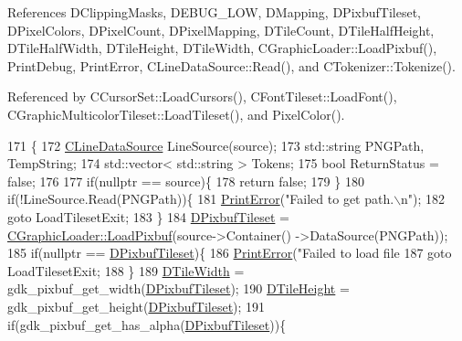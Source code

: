 References D\+Clipping\+Masks, D\+E\+B\+U\+G\+\_\+\+L\+OW, D\+Mapping, D\+Pixbuf\+Tileset, D\+Pixel\+Colors, D\+Pixel\+Count, D\+Pixel\+Mapping, D\+Tile\+Count, D\+Tile\+Half\+Height, D\+Tile\+Half\+Width, D\+Tile\+Height, D\+Tile\+Width, C\+Graphic\+Loader\+::\+Load\+Pixbuf(), Print\+Debug, Print\+Error, C\+Line\+Data\+Source\+::\+Read(), and C\+Tokenizer\+::\+Tokenize().



Referenced by C\+Cursor\+Set\+::\+Load\+Cursors(), C\+Font\+Tileset\+::\+Load\+Font(), C\+Graphic\+Multicolor\+Tileset\+::\+Load\+Tileset(), and Pixel\+Color().


\begin{DoxyCode}
171                                                                     \{
172     \hyperlink{classCLineDataSource}{CLineDataSource} LineSource(source);
173     std::string PNGPath, TempString;
174     std::vector< std::string > Tokens;
175     \textcolor{keywordtype}{bool} ReturnStatus = \textcolor{keyword}{false};
176     
177     \textcolor{keywordflow}{if}(\textcolor{keyword}{nullptr} == source)\{
178         \textcolor{keywordflow}{return} \textcolor{keyword}{false};   
179     \}
180     \textcolor{keywordflow}{if}(!LineSource.Read(PNGPath))\{
181         \hyperlink{Debug_8h_a2ed825eefefe35baf59a93a8c641323d}{PrintError}(\textcolor{stringliteral}{"Failed to get path.\(\backslash\)n"});
182         \textcolor{keywordflow}{goto} LoadTilesetExit;
183     \}
184     \hyperlink{classCGraphicTileset_a5d5adfcdbb347a6df3f57535ca08e3ef}{DPixbufTileset} = \hyperlink{classCGraphicLoader_ac7778dec4fd0ea51674f0b23f3029edf}{CGraphicLoader::LoadPixbuf}(source->Container()
      ->DataSource(PNGPath));
185     \textcolor{keywordflow}{if}(\textcolor{keyword}{nullptr} == \hyperlink{classCGraphicTileset_a5d5adfcdbb347a6df3f57535ca08e3ef}{DPixbufTileset})\{
186         \hyperlink{Debug_8h_a2ed825eefefe35baf59a93a8c641323d}{PrintError}(\textcolor{stringliteral}{"Failed to load file %
187         \textcolor{keywordflow}{goto} LoadTilesetExit;        
188     \}
189     \hyperlink{classCGraphicTileset_a2d0c7d19865b81911a3a43d5cae50e00}{DTileWidth} = gdk\_pixbuf\_get\_width(\hyperlink{classCGraphicTileset_a5d5adfcdbb347a6df3f57535ca08e3ef}{DPixbufTileset});
190     \hyperlink{classCGraphicTileset_af48f32e07d5fe69afd5f764318cc3244}{DTileHeight} = gdk\_pixbuf\_get\_height(\hyperlink{classCGraphicTileset_a5d5adfcdbb347a6df3f57535ca08e3ef}{DPixbufTileset});
191     \textcolor{keywordflow}{if}(gdk\_pixbuf\_get\_has\_alpha(\hyperlink{classCGraphicTileset_a5d5adfcdbb347a6df3f57535ca08e3ef}{DPixbufTileset}))\{
}
\end{DoxyCode}
